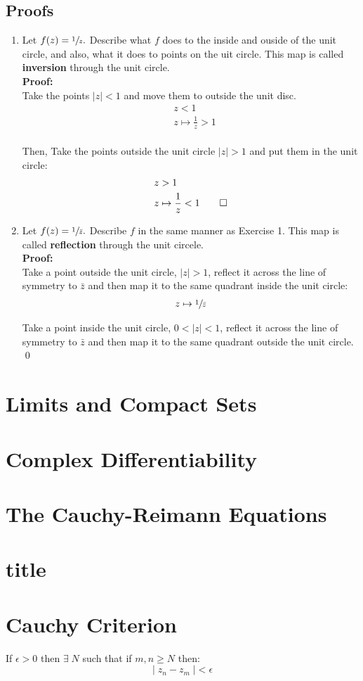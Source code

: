 \subsection{Proofs}
\begin{enumerate}
	\item Let $f(z) = \sfrac{1}{z}.$ Describe what $f$ does to the inside and ouside of the unit circle, and also, what it does to points on the uit circle. This map is called \textbf{inversion} through the unit circle. \\

	\textbf{Proof:} \\
	Take the points $|z| < 1$ and move them to outside the unit disc.
	\begin{align*}
		&z < 1 \\
		&z \mapsto \frac{1}{z} > 1
	\end{align*}
	\\
	Then, Take the points outside the unit circle $|z| > 1$ and put them in the unit circle:
	\begin{align*}
		&z > 1 \\
		&z \mapsto \frac{1}{z} < 1 \qed
	\end{align*}


	\item Let $f(z) = \sfrac{1}{\bar{z}}.$ Describe $f$ in the same manner as Exercise 1. This map is called \textbf{reflection} through the unit circele. \\

	\textbf{Proof:} \\
	Take a point outside the unit circle, $|z| > 1$, reflect it across the line of symmetry to $\bar{z}$ and then map it to the same quadrant inside the unit circle:
	\begin{align*}
		z \mapsto \sfrac{1}{\bar{z}} \\
	\end{align*}

	Take a point inside the unit circle, $0 < |z| < 1$, reflect it across the line of symmetry to $\bar{z}$ and then map it to the same quadrant outside the unit circle. \qed
\end{enumerate}


\section{Limits and Compact Sets}
\section{Complex Differentiability}
\section{The Cauchy-Reimann Equations}
\section{title}

\section{Cauchy Criterion}
\begin{defn}
	If $\epsilon > 0$ then $\exists \; N$ such that if $m, n \geq N$ then:
	\[|\; {z}_{n} - {z}_{m} \; | < \epsilon\]
\end{defn}



